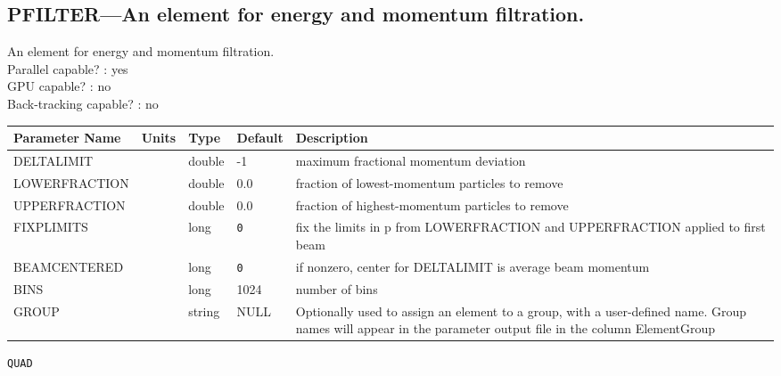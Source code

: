 \subsection{PFILTER---An element for energy and momentum filtration.}
An element for energy and momentum filtration.
\\
Parallel capable? : yes\\
GPU capable? : no\\
Back-tracking capable? : no\\
\begin{tabular}{|l|l|l|l|p{\descwidth}|} \hline
Parameter Name & Units & Type & Default & Description \\ \hline 
DELTALIMIT &  & double &   -1 & maximum fractional momentum deviation  \\ \hline 
LOWERFRACTION &  & double &  0.0 & fraction of lowest-momentum particles to remove  \\ \hline 
UPPERFRACTION &  & double &  0.0 & fraction of highest-momentum particles to remove  \\ \hline 
FIXPLIMITS &  & long &  \verb|0| & fix the limits in p from LOWERFRACTION and UPPERFRACTION applied to first beam  \\ \hline 
BEAMCENTERED &  & long &  \verb|0| & if nonzero, center for DELTALIMIT is average beam momentum  \\ \hline 
BINS &  & long &   1024            & number of bins  \\ \hline 
GROUP &  & string & NULL & Optionally used to assign an element to a group, with a user-defined name.  Group names will appear in the parameter output file in the column ElementGroup  \\ \hline 
\end{tabular}

\newpage
\begin{center}{\Large\verb|QUAD|}\end{center}
